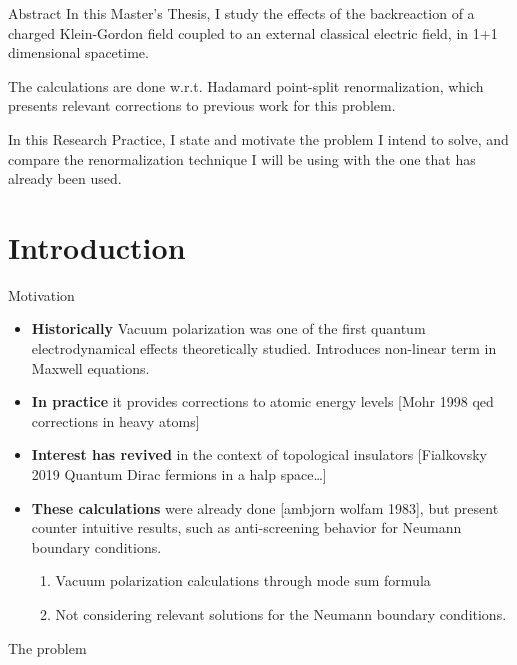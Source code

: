 \begin{frame}{Abstract}
	In this Master's Thesis, I study the effects of the backreaction of a charged Klein-Gordon field coupled to an external classical electric field, in 1+1 dimensional spacetime.

	The calculations are done w.r.t. Hadamard point-split renormalization, which presents relevant corrections to previous work for this problem. 

In this Research Practice, I state and motivate the problem I intend to solve, and compare the renormalization technique I will be using with the one that has already been used. 
\end{frame}

\section{Introduction}

\begin{frame}{Motivation}
	\begin{itemize}[<+->]
	\item \textbf{Historically} Vacuum polarization was one of the first quantum electrodynamical effects theoretically studied. Introduces non-linear term in Maxwell equations.
	\item \textbf{In practice} it provides corrections to atomic energy levels  [Mohr 1998 qed corrections in heavy atoms] 
	\item \textbf{Interest has revived} in the context of topological insulators [Fialkovsky 2019 Quantum Dirac fermions in a halp space\ldots]
	\item  \textbf{These calculations }were already done [ambjorn wolfam 1983], but present counter intuitive results, such as anti-screening behavior for Neumann boundary conditions.
		\begin{enumerate}
			\item Vacuum polarization calculations through mode sum formula
			\item Not considering relevant solutions for the Neumann boundary conditions.
		\end{enumerate}
\end{itemize}
	
\end{frame}

\begin{frame}{The problem}
	
\end{frame}

